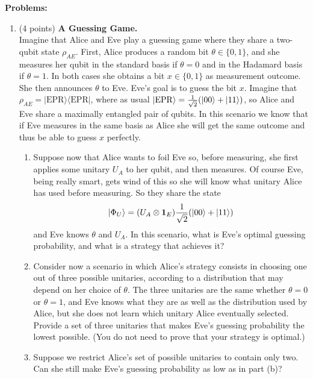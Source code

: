 \documentclass[12pt]{article}
\begin{document}
{\bf Problems:}
\begin{enumerate}



\item (4 points) \textbf{A Guessing Game.}\\
Imagine that Alice and Eve play a guessing game where they share a two-qubit state \(\rho_{AE}\). First, Alice produces a random bit \(\theta\in\{0,1\}\), and she measures her qubit in the standard basis if \(\theta=0\) and in the Hadamard basis if \(\theta=1\). In both cases she obtains a bit \(x\in\{0,1\}\) as measurement outcome. She then announces \(\theta\) to Eve. Eve's goal is to guess the bit \(x\). Imagine that \(\rho_{AE} = |\mathrm{EPR}\rangle\langle\mathrm{EPR}|\), where as usual $\ket{\mathrm{EPR}} = \frac{1}{\sqrt{2}}(\ket{00}+\ket{11})$, so Alice and Eve share a maximally entangled pair of qubits. In this scenario we know that if Eve measures in the same basis as Alice she will get the same outcome and  thus be able to guess \(x\) perfectly.
\begin{enumerate}
\item Suppose now that Alice wants to foil Eve so, before measuring, she first applies some unitary \(U_A\) to her qubit, and then measures. Of course Eve, being really smart, gets wind of this so she will know what unitary Alice has used before measuring. So they share the state\\
\[|\Phi_U\rangle = (U_A\otimes \mathbf{1}_E)\frac{1}{\sqrt{2}}(\ket{00}+ \ket{11})\]
and Eve knows \(\theta\) and \(U_A\). In this scenario, what is Eve's optimal guessing probability, and what is a strategy that achieves it? 
\item Consider now a scenario in which Alice's strategy consists in choosing one out of three possible unitaries, according to a distribution that may depend on her choice of $\theta$. The three unitaries are the same whether $\theta=0$ or $\theta=1$, and Eve knows what they are as well as the distribution used by Alice, but she does not learn which unitary Alice eventually selected. Provide a set of three unitaries that makes Eve's guessing probability the lowest possible. (You do not need to prove that your strategy is optimal.)
\item Suppose we restrict Alice's set of possible unitaries to contain only two. Can she still make Eve's guessing probability as low as in part (b)?
\end{enumerate}




\end{enumerate}
\end{document}
